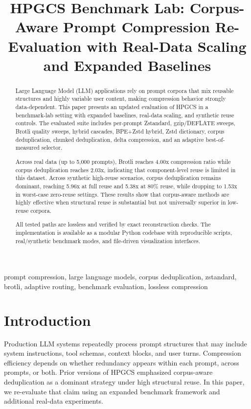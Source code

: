 \documentclass[10pt,conference]{IEEEtran}
\title{HPGCS Benchmark Lab: Corpus-Aware Prompt Compression Re-Evaluation with Real-Data Scaling and Expanded Baselines}
\author{\IEEEauthorblockN{Author Placeholder 1, Author Placeholder 2}}
\begin{document}
\maketitle

\begin{abstract}
Large Language Model (LLM) applications rely on prompt corpora that mix reusable structures and highly variable user content, making compression behavior strongly data-dependent. This paper presents an updated evaluation of HPGCS in a benchmark-lab setting with expanded baselines, real-data scaling, and synthetic reuse controls. The evaluated suite includes per-prompt Zstandard, gzip/DEFLATE sweeps, Brotli quality sweeps, hybrid cascades, BPE+Zstd hybrid, Zstd dictionary, corpus deduplication, chunked deduplication, delta compression, and an adaptive best-of-measured selector.

Across real data (up to 5,000 prompts), Brotli reaches 4.00x compression ratio while corpus deduplication reaches 2.03x, indicating that component-level reuse is limited in this dataset. Across synthetic high-reuse scenarios, corpus deduplication remains dominant, reaching 5.96x at full reuse and 5.38x at 80\% reuse, while dropping to 1.53x in worst-case zero-reuse settings. These results show that corpus-aware methods are highly effective when structural reuse is substantial but not universally superior in low-reuse corpora.

All tested paths are lossless and verified by exact reconstruction checks. The implementation is available as a modular Python codebase with reproducible scripts, real/synthetic benchmark modes, and file-driven visualization interfaces.
\end{abstract}

\begin{IEEEkeywords}
prompt compression, large language models, corpus deduplication, zstandard, brotli, adaptive routing, benchmark evaluation, lossless compression
\end{IEEEkeywords}

\section{Introduction}
Production LLM systems repeatedly process prompt structures that may include system instructions, tool schemas, context blocks, and user turns. Compression efficiency depends on whether redundancy appears within each prompt, across prompts, or both. Prior versions of HPGCS emphasized corpus-aware deduplication as a dominant strategy under high structural reuse. In this paper, we re-evaluate that claim using an expanded benchmark framework and additional real-data experiments.
\end{document}
